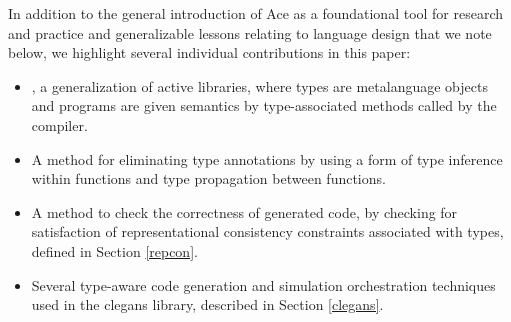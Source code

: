 \documentclass[10pt, conference, compsocconf]{IEEEtran}
\begin{document}
In addition to the general introduction of Ace as a foundational tool for research and practice and generalizable lessons relating to language design that we note below, we highlight several individual contributions in this paper: 

\begin{itemize}
\item \ATT, a generalization of active libraries, where types are metalanguage objects and programs are given semantics by type-associated methods called by the compiler.
\item A method for eliminating type annotations by using a form of type inference within functions and type propagation between functions.
\item A method to check the correctness of generated code, by checking for satisfaction of representational consistency constraints associated with types, defined in Section \ref{repcon}. 
\item Several type-aware code generation and simulation orchestration techniques used in the clegans library, described in Section \ref{clegans}.
\end{itemize}

%
%
\end{document}
